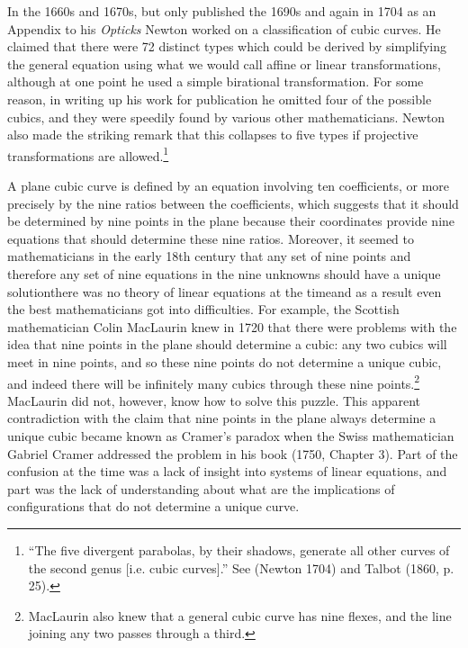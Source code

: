 In the 1660s and 1670s, but only published  the 1690s and again in 1704 as an Appendix to his \emph{Opticks} Newton worked on a classification of cubic curves. He claimed that there were 72 distinct types which could be derived by simplifying the general equation using what we would call affine or linear transformations, although at one point he used a simple birational transformation. For some reason, in writing up his work for publication he omitted four of the possible cubics, and they were speedily found by various other mathematicians.  Newton also made the striking remark that this collapses to five types if projective transformations are allowed.\footnote{``The five divergent parabolas, by their shadows, generate all other curves of the second genus [i.e. cubic curves].'' See (Newton  1704) and Talbot (1860, p. 25).}





A plane cubic curve is defined by an equation involving ten coefficients, or more precisely by the nine ratios between the coefficients, which suggests that it should be determined by nine points in the plane because their coordinates provide nine equations that should determine these nine ratios.  Moreover, it seemed to mathematicians in the early 18th century that any set of nine points and therefore any set of nine equations in the nine unknowns should have a unique solution\emdash there was no theory of linear equations at the time\emdash  and as a result even the best mathematicians got into difficulties. For example, the Scottish mathematician Colin MacLaurin  knew in 1720 that there were problems with the idea that nine points in the plane should determine a cubic: any two cubics will meet in nine points, and so these nine points do not determine a unique cubic, and indeed there will be infinitely many cubics through these nine points.\footnote{MacLaurin also knew that a general cubic curve has nine flexes, and the line joining any two passes through a third.}  MacLaurin did not, however, know how to solve this puzzle.  This apparent contradiction with the claim that nine points in the plane always determine a unique cubic became known as Cramer's paradox when the Swiss mathematician Gabriel Cramer addressed the problem in his book (1750, Chapter 3).  Part of the confusion at the time was a lack of insight into systems of linear equations, and part was the lack of understanding about what are the implications of configurations that do not determine a unique curve. 


